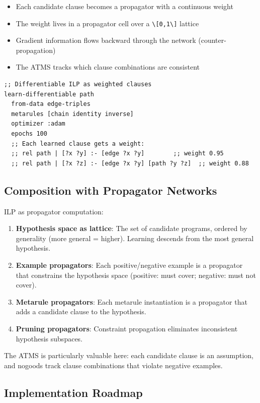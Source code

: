 \documentclass[11pt]{article}
\begin{document}
\begin{itemize}
\item Each candidate clause becomes a propagator with a continuous weight
\item The weight lives in a propagator cell over a \texttt{\textbackslash{}[0,1\textbackslash{}]} lattice
\item Gradient information flows backward through the network (counter-propagation)
\item The ATMS tracks which clause combinations are consistent
\end{itemize}

\begin{verbatim}
;; Differentiable ILP as weighted clauses
learn-differentiable path
  from-data edge-triples
  metarules [chain identity inverse]
  optimizer :adam
  epochs 100
  ;; Each learned clause gets a weight:
  ;; rel path | [?x ?y] :- [edge ?x ?y]        ;; weight 0.95
  ;; rel path | [?x ?z] :- [edge ?x ?y] [path ?y ?z]  ;; weight 0.88
\end{verbatim}
\subsection{Composition with Propagator Networks}
\label{sec:orgfafff6b}

ILP as propagator computation:

\begin{enumerate}
\item \textbf{Hypothesis space as lattice}: The set of candidate programs, ordered by
generality (more general = higher). Learning descends from the most general
hypothesis.
\item \textbf{Example propagators}: Each positive/negative example is a propagator that
constrains the hypothesis space (positive: must cover; negative: must not cover).
\item \textbf{Metarule propagators}: Each metarule instantiation is a propagator that
adds a candidate clause to the hypothesis.
\item \textbf{Pruning propagators}: Constraint propagation eliminates inconsistent
hypothesis subspaces.
\end{enumerate}

The ATMS is particularly valuable here: each candidate clause is an assumption,
and nogoods track clause combinations that violate negative examples.
\subsection{Implementation Roadmap}
\label{sec:orgdf3a6c4}
\end{document}
